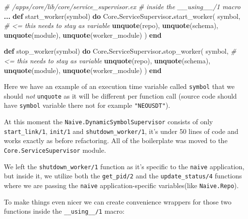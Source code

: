 \documentclass[
]{book}
\newenvironment{Shaded}{\begin{snugshade}}{\end{snugshade}}
\newcommand{\CommentTok}[1]{\textcolor[rgb]{0.56,0.35,0.01}{\textit{#1}}}
\newcommand{\ConstantTok}[1]{\textcolor[rgb]{0.00,0.00,0.00}{#1}}
\newcommand{\KeywordTok}[1]{\textcolor[rgb]{0.13,0.29,0.53}{\textbf{#1}}}
\newcommand{\NormalTok}[1]{#1}
\newcommand{\OperatorTok}[1]{\textcolor[rgb]{0.81,0.36,0.00}{\textbf{#1}}}
\begin{document}
\begin{Shaded}
\begin{Highlighting}[]
      \CommentTok{\# /apps/core/lib/core/service\_supervisor.ex}
      \CommentTok{\# inside the \_\_using\_\_/1 macro}
      \OperatorTok{...}
      \KeywordTok{def}\NormalTok{ start\_worker(symbol) }\KeywordTok{do}
        \ConstantTok{Core}\OperatorTok{.}\ConstantTok{ServiceSupervisor}\OperatorTok{.}\NormalTok{start\_worker(}
\NormalTok{          symbol, }\CommentTok{\# \textless{}= this needs to stay as variable}
          \KeywordTok{unquote}\NormalTok{(repo),}
          \KeywordTok{unquote}\NormalTok{(schema),}
          \KeywordTok{unquote}\NormalTok{(module), }
          \KeywordTok{unquote}\NormalTok{(worker\_module)}
\NormalTok{        )}
      \KeywordTok{end}

      \KeywordTok{def}\NormalTok{ stop\_worker(symbol) }\KeywordTok{do}
        \ConstantTok{Core}\OperatorTok{.}\ConstantTok{ServiceSupervisor}\OperatorTok{.}\NormalTok{stop\_worker(}
\NormalTok{          symbol, }\CommentTok{\# \textless{}= this needs to stay as variable}
          \KeywordTok{unquote}\NormalTok{(repo),}
          \KeywordTok{unquote}\NormalTok{(schema),}
          \KeywordTok{unquote}\NormalTok{(module),}
          \KeywordTok{unquote}\NormalTok{(worker\_module)}
\NormalTok{        )}
      \KeywordTok{end}
\end{Highlighting}
\end{Shaded}

Here we have an example of an execution time variable called \texttt{symbol} that we should \emph{not} \texttt{unquote} as it will be different per function call (source code should have \texttt{symbol} variable there not for example \texttt{"NEOUSDT"}).

At this moment the \texttt{Naive.DynamicSymbolSupervisor} consists of only \texttt{start\_link/1}, \texttt{init/1} and \texttt{shutdown\_worker/1}, it's under 50 lines of code and works exactly as before refactoring. All of the boilerplate was moved to the \texttt{Core.ServiceSupervisor} module.

We left the \texttt{shutdown\_worker/1} function as it's specific to the \texttt{naive} application, but inside it, we utilize both the \texttt{get\_pid/2} and the \texttt{update\_status/4} functions where we are passing the \texttt{naive} application-specific variables(like \texttt{Naive.Repo}).

To make things even nicer we can create convenience wrappers for those two functions inside the \texttt{\_\_using\_\_/1} macro:
\end{document}
